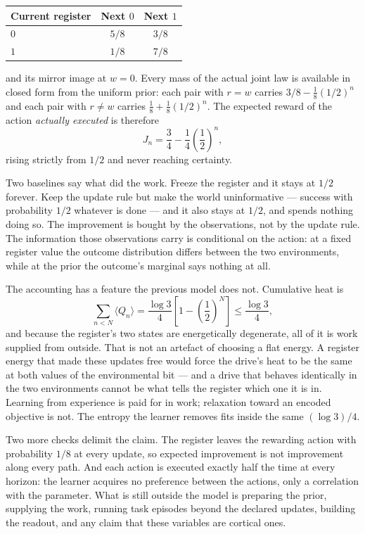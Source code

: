\documentclass[11pt]{article}
\begin{document}
\begin{center}
\begin{tabular}{lcc}
\hline
Current register & Next $0$ & Next $1$ \\
\hline
$0$ & $5/8$ & $3/8$ \\
$1$ & $1/8$ & $7/8$ \\
\hline
\end{tabular}
\end{center}

\noindent and its mirror image at $w=0$. Every mass of the actual joint law is
available in closed form from the uniform prior: each pair with $r=w$ carries
$3/8-\frac18(1/2)^n$ and each pair with $r\neq w$ carries
$\frac18+\frac18(1/2)^n$. The expected reward of the action \emph{actually
executed} is therefore
\[
 J_n=\frac34-\frac14\left(\frac12\right)^n,
\]
rising strictly from $1/2$ and never reaching certainty.

Two baselines say what did the work. Freeze the register and it stays at
$1/2$ forever. Keep the update rule but make the world uninformative --- success
with probability $1/2$ whatever is done --- and it also stays at $1/2$, and
spends nothing doing so. The improvement is bought by the observations, not by
the update rule. The information those observations carry is conditional on the
action: at a fixed register value the outcome distribution differs between the
two environments, while at the prior the outcome's marginal says nothing at all.

The accounting has a feature the previous model does not. Cumulative heat is
\[
 \sum_{n<N}\langle Q_n\rangle=\frac{\log3}{4}\left[1-\left(\frac12\right)^N\right]
 \leq\frac{\log3}{4},
\]
and because the register's two states are energetically degenerate, all of it is
work supplied from outside. That is not an artefact of choosing a flat energy.
A register energy that made these updates free would force the drive's heat to
be the same at both values of the environmental bit --- and a drive that behaves
identically in the two environments cannot be what tells the register which one
it is in. Learning from experience is paid for in work; relaxation toward an
encoded objective is not. The entropy the learner removes fits inside the same
$(\log3)/4$.

Two more checks delimit the claim. The register leaves the rewarding action
with probability $1/8$ at every update, so expected improvement is not
improvement along every path. And each action is executed exactly half the time
at every horizon: the learner acquires no preference between the actions, only a
correlation with the parameter. What is still outside the model is preparing the
prior, supplying the work, running task episodes beyond the declared updates,
building the readout, and any claim that these variables are cortical ones.
\end{document}

